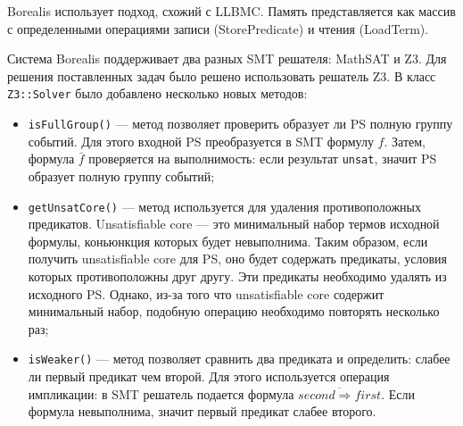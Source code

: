 Borealis использует подход, схожий с LLBMC\cite{llbmc}. Память представляется как массив с определенными операциями записи (StorePredicate) и чтения (LoadTerm)\cite{smtlib}.

Система Borealis поддерживает два разных SMT решателя: MathSAT\cite{mathsatsolver} и Z3. Для решения поставленных задач было решено использовать решатель Z3. В класс \texttt{Z3::Solver} было добавлено несколько новых методов:
\begin{itemize}
\item \texttt{isFullGroup()} --- метод позволяет проверить образует ли PS полную группу событий. Для этого входной PS преобразуется в SMT формулу $f$. Затем, формула $\bar{f}$ проверяется на выполнимость: если результат \texttt{unsat}, значит PS образует полную группу событий;
\item \texttt{getUnsatCore()} --- метод используется для удаления противоположных предикатов. Unsatisfiable core\cite{unsatcore} --- это минимальный набор термов исходной формулы, коньюнкция которых будет невыполнима. Таким образом, если получить unsatisfiable core для PS, оно будет содержать предикаты, условия которых противоположны друг другу. Эти предикаты необходимо удалять из исходного PS. Однако, из-за того что unsatisfiable core содержит минимальный набор, подобную операцию необходимо повторять несколько раз;
\item \texttt{isWeaker()} --- метод позволяет сравнить два предиката и определить: слабее ли первый предикат чем второй. Для этого используется операция импликации: в SMT решатель подается формула $\overline{second \Longrightarrow first}$. Если формула невыполнима, значит первый предикат слабее второго.
\end{itemize}
